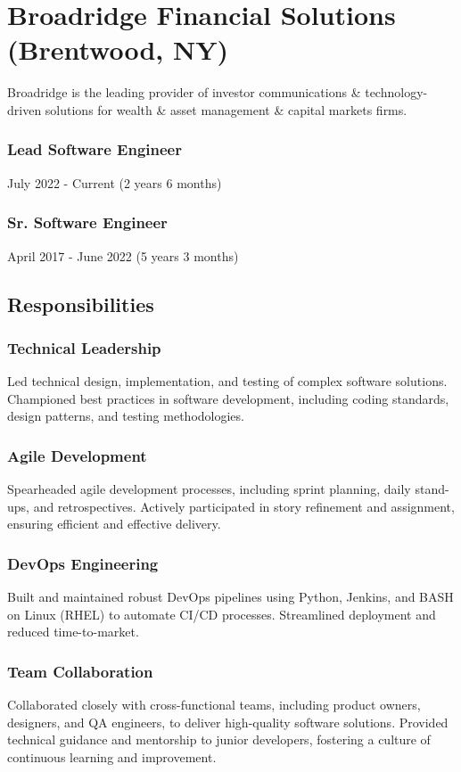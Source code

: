 \documentclass[letterpaper,9pt]{article}
\begin{document}
    \section{Broadridge Financial Solutions (Brentwood, NY)}{
    	Broadridge is the leading provider of investor communications \& technology-driven solutions for wealth \& asset management \& capital markets firms.}    
    \subsubsection{Lead Software Engineer}{July 2022 - Current (2 years 6 months)}
    \subsubsection{Sr. Software Engineer}{April 2017 - June 2022 (5 years 3 months)}
    \subsection{Responsibilities}
	\subsubsection{Technical Leadership}{Led technical design, implementation, and testing of complex software solutions. Championed best practices in software development, including coding standards, design patterns, and testing methodologies.}
	\subsubsection{Agile Development}{Spearheaded agile development processes, including sprint planning, daily stand-ups, and retrospectives. Actively participated in story refinement and assignment, ensuring efficient and effective delivery.}
	\subsubsection{DevOps Engineering}{Built and maintained robust DevOps pipelines using Python, Jenkins, and BASH on Linux (RHEL) to automate CI/CD processes. Streamlined deployment and reduced time-to-market.}
	\subsubsection{Team Collaboration}{Collaborated closely with cross-functional teams, including product owners, designers, and QA engineers, to deliver high-quality software solutions. Provided technical guidance and mentorship to junior developers, fostering a culture of continuous learning and improvement.}
\end{document}
